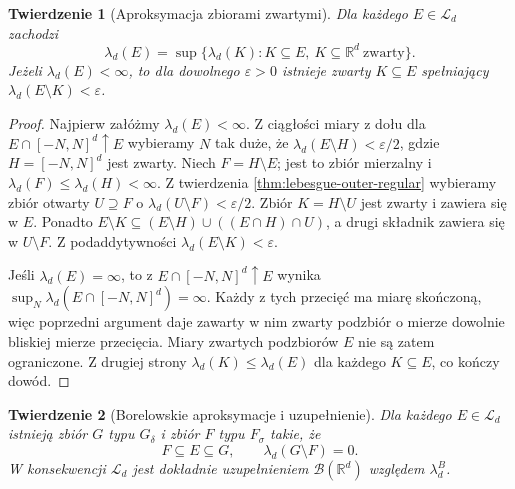 \documentclass[11pt,a4paper,oneside]{book}
\numberwithin{equation}{chapter}
\theoremstyle{plain}
\newtheorem{twierdzenie}{Twierdzenie}[chapter]
\theoremstyle{definition}
\theoremstyle{remark}
\begin{document}
\begin{twierdzenie}[Aproksymacja zbiorami zwartymi]
\label{thm:lebesgue-inner-regular}
Dla każdego $E\in\mathcal L_d$ zachodzi
\begin{equation}\label{eq:inner-compact-regular}
\lambda_d(E)=\sup\{\lambda_d(K):K\subseteq E,
\ K\subseteq\mathbb R^d\ \text{zwarty}\}.
\end{equation}
Jeżeli $\lambda_d(E)<\infty$, to dla dowolnego
$\varepsilon>0$ istnieje zwarty $K\subseteq E$
spełniający $\lambda_d(E\setminus K)<\varepsilon$.
\end{twierdzenie}

\begin{proof}
Najpierw załóżmy $\lambda_d(E)<\infty$.
Z ciągłości miary z dołu dla
$E\cap[-N,N]^d\uparrow E$ wybieramy $N$ tak duże, że
$\lambda_d(E\setminus H)<\varepsilon/2$, gdzie
$H=[-N,N]^d$ jest zwarty.
Niech $F=H\setminus E$; jest to zbiór mierzalny
i $\lambda_d(F)\le\lambda_d(H)<\infty$.
Z twierdzenia \ref{thm:lebesgue-outer-regular}
wybieramy zbiór otwarty $U\supseteq F$ o
$\lambda_d(U\setminus F)<\varepsilon/2$.
Zbiór $K=H\setminus U$ jest zwarty i zawiera się
w $E$. Ponadto
$E\setminus K\subseteq(E\setminus H)
\cup((E\cap H)\cap U)$, a drugi składnik zawiera się
w $U\setminus F$. Z podaddytywności
$\lambda_d(E\setminus K)<\varepsilon$.

Jeśli $\lambda_d(E)=\infty$, to z
$E\cap[-N,N]^d\uparrow E$ wynika
$\sup_N\lambda_d(E\cap[-N,N]^d)=\infty$.
Każdy z tych przecięć ma miarę skończoną, więc
poprzedni argument daje zawarty w nim zwarty podzbiór
o mierze dowolnie bliskiej mierze przecięcia. Miary
zwartych podzbiorów $E$ nie są zatem ograniczone.
Z drugiej strony $\lambda_d(K)\le\lambda_d(E)$ dla
każdego $K\subseteq E$, co kończy dowód.
\end{proof}

\begin{twierdzenie}[Borelowskie aproksymacje i uzupełnienie]
\label{thm:lebesgue-completion}
Dla każdego $E\in\mathcal L_d$ istnieją
zbiór $G$ typu $G_\delta$ i zbiór $F$ typu $F_\sigma$
takie, że
\begin{equation}\label{eq:lebesgue-Borel-approx}
F\subseteq E\subseteq G,\qquad
\lambda_d(G\setminus F)=0.
\end{equation}
W konsekwencji $\mathcal L_d$ jest dokładnie
uzupełnieniem $\mathcal B(\mathbb R^d)$ względem
$\lambda_d^B$.
\end{twierdzenie}
\end{document}
